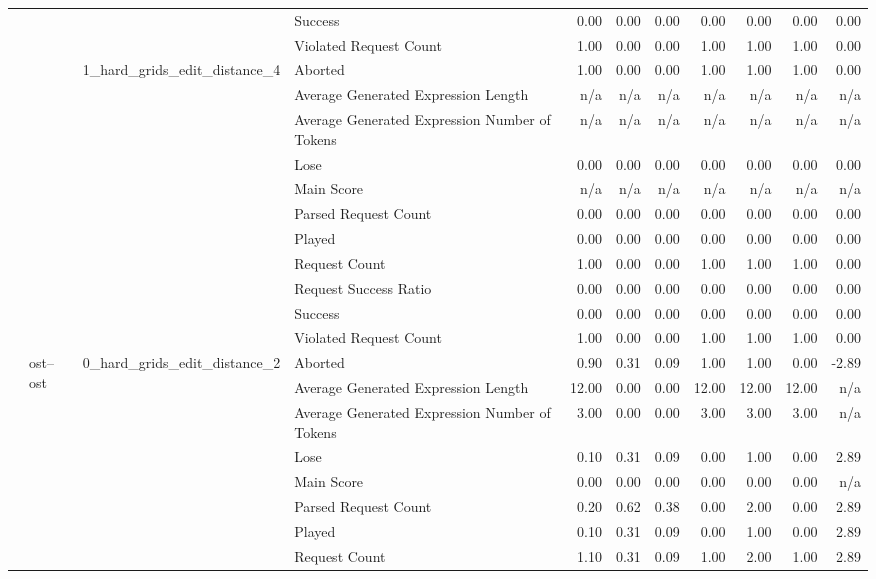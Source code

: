 \begin{tabular}{llllrrrrrrr}
 &  &  & Success & 0.00 & 0.00 & 0.00 & 0.00 & 0.00 & 0.00 & 0.00 \\
 &  &  & Violated Request Count & 1.00 & 0.00 & 0.00 & 1.00 & 1.00 & 1.00 & 0.00 \\
\cline{3-11}
 &  & \multirow[t]{11}{*}{1_hard_grids_edit_distance_4} & Aborted & 1.00 & 0.00 & 0.00 & 1.00 & 1.00 & 1.00 & 0.00 \\
 &  &  & Average Generated Expression Length & n/a & n/a & n/a & n/a & n/a & n/a & n/a \\
 &  &  & Average Generated Expression Number of Tokens & n/a & n/a & n/a & n/a & n/a & n/a & n/a \\
 &  &  & Lose & 0.00 & 0.00 & 0.00 & 0.00 & 0.00 & 0.00 & 0.00 \\
 &  &  & Main Score & n/a & n/a & n/a & n/a & n/a & n/a & n/a \\
 &  &  & Parsed Request Count & 0.00 & 0.00 & 0.00 & 0.00 & 0.00 & 0.00 & 0.00 \\
 &  &  & Played & 0.00 & 0.00 & 0.00 & 0.00 & 0.00 & 0.00 & 0.00 \\
 &  &  & Request Count & 1.00 & 0.00 & 0.00 & 1.00 & 1.00 & 1.00 & 0.00 \\
 &  &  & Request Success Ratio & 0.00 & 0.00 & 0.00 & 0.00 & 0.00 & 0.00 & 0.00 \\
 &  &  & Success & 0.00 & 0.00 & 0.00 & 0.00 & 0.00 & 0.00 & 0.00 \\
 &  &  & Violated Request Count & 1.00 & 0.00 & 0.00 & 1.00 & 1.00 & 1.00 & 0.00 \\
\cline{2-11} \cline{3-11}
 & \multirow[t]{22}{*}{ost--ost} & \multirow[t]{11}{*}{0_hard_grids_edit_distance_2} & Aborted & 0.90 & 0.31 & 0.09 & 1.00 & 1.00 & 0.00 & -2.89 \\
 &  &  & Average Generated Expression Length & 12.00 & 0.00 & 0.00 & 12.00 & 12.00 & 12.00 & n/a \\
 &  &  & Average Generated Expression Number of Tokens & 3.00 & 0.00 & 0.00 & 3.00 & 3.00 & 3.00 & n/a \\
 &  &  & Lose & 0.10 & 0.31 & 0.09 & 0.00 & 1.00 & 0.00 & 2.89 \\
 &  &  & Main Score & 0.00 & 0.00 & 0.00 & 0.00 & 0.00 & 0.00 & n/a \\
 &  &  & Parsed Request Count & 0.20 & 0.62 & 0.38 & 0.00 & 2.00 & 0.00 & 2.89 \\
 &  &  & Played & 0.10 & 0.31 & 0.09 & 0.00 & 1.00 & 0.00 & 2.89 \\
 &  &  & Request Count & 1.10 & 0.31 & 0.09 & 1.00 & 2.00 & 1.00 & 2.89 \\

\end{tabular}
